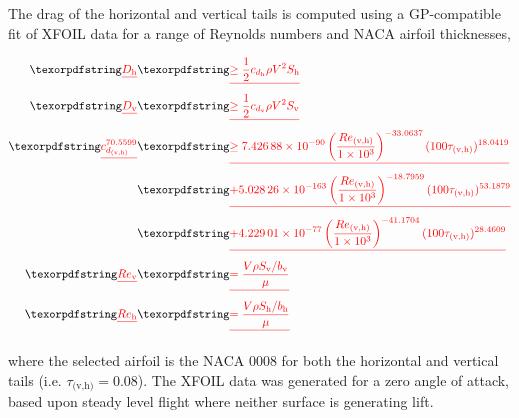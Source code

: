 The drag of the horizontal and vertical tails is computed using a GP-compatible fit of XFOIL data for a range of Reynolds numbers and NACA airfoil thicknesses,
\DIFdelbegin %

\begin{eqnarray*}
    \DIFdel{D_{\text{h}} }&\DIFdel{\geq \frac{1}{2} c_{d_{\text{h}}} \rho V^2 S_{\text{h}} }\\
    \DIFdel{D_{\text{v}} }&\DIFdel{\geq \frac{1}{2} c_{d_{\text{v}}} \rho V^2 S_{\text{v}} }\\
    \DIFdel{\label{e:taildrag}
    c_{d_{\text{(v,h)}}}^{70.5599} }&\DIFdel{\geq \num{7.42688d-90} \left( \frac{Re_{\text{(v,h)}}}{\num{1d3}} \right)^{-33.0637}(100 \tau_{\text{(v,h)}})^{18.0419}  \nonumber }\\
                 & \DIFdel{+ \num{5.02826d-163}\left(\frac{Re_{\text{(v,h)}}}{\num{1d3}}\right)^{-18.7959} (100\tau_{\text{(v,h)}})^{53.1879} }\\
                 &\DIFdel{+ \num{4.22901d-77}\left(\frac{Re_{\text{(v,h)}}}{\num{1d3}}\right)^{-41.1704} (100\tau_{\text{(v,h)}})^{28.4609} \nonumber }\\
    \DIFdel{Re_{\text{v}} }&\DIFdel{= \frac{V\rho S_{\text{v}}/b_{\text{v}}}{\mu} }\\
    \DIFdel{Re_{\text{h}} }&\DIFdel{= \frac{V\rho S_{\text{h}}/b_{\text{h}}}{\mu} 
}\end{eqnarray*}

\DIFdelend where the selected airfoil is the NACA 0008 for both the horizontal and vertical tails (i.e. $\tau_{\text{(v,h)}} = 0.08$). 
The XFOIL data was generated for a zero angle of attack, based upon steady level flight where neither surface is generating lift.  
\DIFdelbegin {}\DIFdelend \DIFaddbegin 


